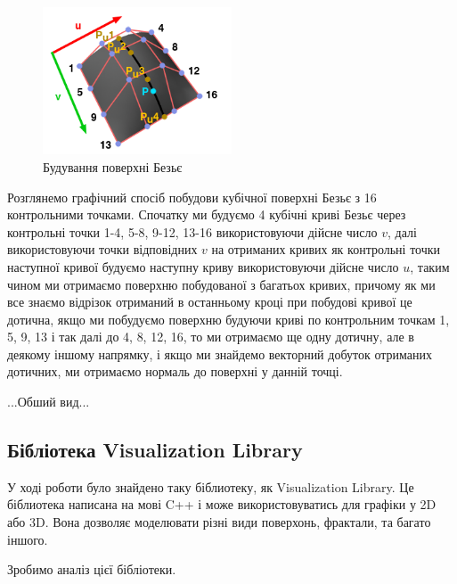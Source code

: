 \documentclass[14pt,a4paper]{extarticle}
\theoremstyle{definition}
\renewcommand{\[}{\begin{singlespace}\begin{equation*}}
\renewcommand{\]}{\end{equation*}\end{singlespace}}
\begin{document}
\begin{figure}[!htb]
    \centering
    \includegraphics[width=0.5\textwidth]{bezier-surface.png}
    \caption{Будування поверхні Безьє}\label{fig:bezier-surface}
\end{figure}

Розглянемо графічний спосіб побудови кубічної поверхні Безьє з 16 контрольними точками. Спочатку ми будуємо 4 кубічні криві Безьє через контрольні точки 1-4, 5-8, 9-12, 13-16 використовуючи дійсне число $v$, далі використовуючи точки відповідних $v$ на отриманих кривих як контрольні точки наступної кривої будуємо наступну криву використовуючи дійсне число $u$, таким чином ми отримаємо поверхню побудованої з багатьох кривих, причому як ми все знаємо відрізок отриманий в останньому кроці при побудові кривої це дотична, якщо ми побудуємо поверхню будуючи криві по контрольним точкам 1, 5, 9, 13 і так далі до 4, 8, 12, 16, то ми отримаємо ще одну дотичну, але в деякому іншому напрямку, і якщо ми знайдемо векторний добуток отриманих дотичних, ми отримаємо нормаль до поверхні у данній точці.

...Обший вид...

\subsection{Бібліотека Visualization Library}

У ході роботи було знайдено таку біблиотеку, як Visualization Library. Це біблиотека написана на мові C++ і може використовуватись для графіки у 2D або 3D. Вона дозволяє моделювати різні види поверхонь, фрактали, та багато іншого.

Зробимо аналіз цієї бібліотеки.
\end{document}

